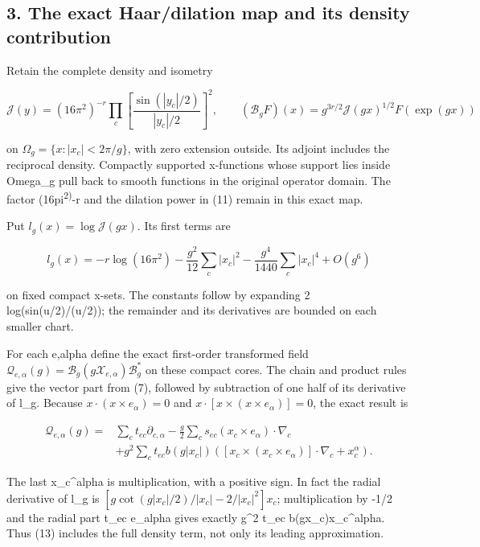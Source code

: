 \documentclass[
  11pt,
]{article}
\begin{document}
\subsection{3. The exact Haar/dilation map and its density
contribution}\label{weak-coupling-part-14-the-exact-haardilation-map-and-its-density-contribution}

Retain the complete density and isometry

\[
 \mathcal J(y)=(16\pi^2)^{-r}
   \prod_c\left[\frac{\sin(|y_c|/2)}{|y_c|/2}\right]^2,
 \qquad
 (\mathcal B_gF)(x)=g^{3r/2}\mathcal J(gx)^{1/2}F(\exp(gx))
                                                               \tag{11}
\]

on \(\Omega_g=\{x:|x_c|<2\pi/g\}\), with zero extension outside. Its
adjoint includes the reciprocal density. Compactly supported x-functions
whose support lies inside Omega\_g pull back to smooth functions in the
original operator domain. The factor (16pi\textsuperscript{2)}-r and the
dilation power in (11) remain in this exact map.

Put \(l_g(x)=\log\mathcal J(gx)\). Its first terms are

\[
 l_g(x)=-r\log(16\pi^2)
   -\frac{g^2}{12}\sum_c|x_c|^2
   -\frac{g^4}{1440}\sum_c|x_c|^4+O(g^6)
                                                               \tag{12}
\]

on fixed compact x-sets. The constants follow by expanding 2
log(sin(u/2)/(u/2)); the remainder and its derivatives are bounded on
each smaller chart.

For each e,alpha define the exact first-order transformed field
\(\mathcal Q_{e,\alpha}(g)=\mathcal B_g(g\mathcal X_{e,\alpha})
\mathcal B_g^*\) on these compact cores. The chain and product rules
give the vector part from (7), followed by subtraction of one half of
its derivative of l\_g. Because \(x\cdot(x\times e_\alpha)=0\) and
\(x\cdot[x\times(x\times e_\alpha)]=0\), the exact result is

\[
 \boxed{\begin{split}
 \mathcal Q_{e,\alpha}(g)
 ={}&\sum_c t_{ec}\partial_{c,\alpha}
   -\frac g2\sum_c s_{ec}(x_c\times e_\alpha)\cdot\nabla_c\\
 &+g^2\sum_c t_{ec}b(g|x_c|)
       \left([x_c\times(x_c\times e_\alpha)]\cdot\nabla_c
                           +x_c^\alpha\right).
 \end{split}}                                                \tag{13}
\]

The last x\_c\^{}alpha is multiplication, with a positive sign. In fact
the radial derivative of l\_g is
\([g\cot(g|x_c|/2)/|x_c|-2/|x_c|^2]x_c\); multiplication by -1/2 and the
radial part t\_ec e\_alpha gives exactly g\^{}2 t\_ec
b(g\textbar x\_c\textbar)x\_c\^{}alpha. Thus (13) includes the full
density term, not only its leading approximation.
\end{document}
